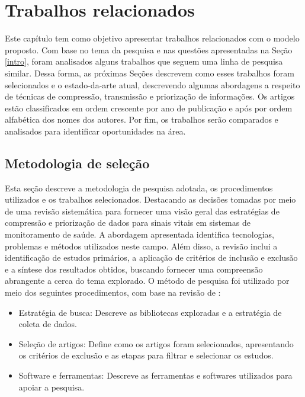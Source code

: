 \documentclass[twoside,english,brazilian]{UNISINOSmonografia}
\begin{document}
\chapter{Trabalhos relacionados}

Este capítulo tem como objetivo apresentar trabalhos relacionados com o modelo proposto. Com base no tema da pesquisa e nas questões apresentadas na Seção \ref{intro}, foram analisados alguns trabalhos que seguem uma linha de pesquisa similar. Dessa forma, as próximas Seções descrevem como esses trabalhos foram selecionados e o estado-da-arte atual, descrevendo algumas abordagens a respeito de técnicas de compressão, transmissão e priorização de informações. Os artigos estão classificados em ordem crescente por ano de publicação e após por ordem alfabética dos nomes dos autores. Por fim, os trabalhos serão comparados e analisados para identificar oportunidades na área.

\section{Metodologia de seleção}

Esta seção descreve a metodologia de pesquisa adotada, os procedimentos utilizados e os trabalhos selecionados.  Destacando as decisões tomadas por meio de uma revisão sistemática para fornecer uma visão geral das estratégias de compressão e priorização de dados para sinais vitais em sistemas de monitoramento de saúde. A abordagem apresentada identifica tecnologias, problemas e métodos utilizados neste campo. Além disso, a revisão inclui a identificação de estudos primários, a aplicação de critérios de inclusão e exclusão e a síntese dos resultados obtidos, buscando fornecer uma compreensão abrangente a cerca do tema explorado. O método de pesquisa foi utilizado por meio dos seguintes procedimentos, com base na revisão de \cite{Robben2017}:

\begin{itemize}
    \item Estratégia de busca: Descreve as bibliotecas exploradas e a estratégia de coleta de dados.
    \item Seleção de artigos: Define como os artigos foram selecionados, apresentando os critérios de exclusão e as etapas para filtrar e selecionar os estudos.
    \item Software e ferramentas: Descreve as ferramentas e softwares utilizados para apoiar a pesquisa.
\end{itemize}
\end{document}
